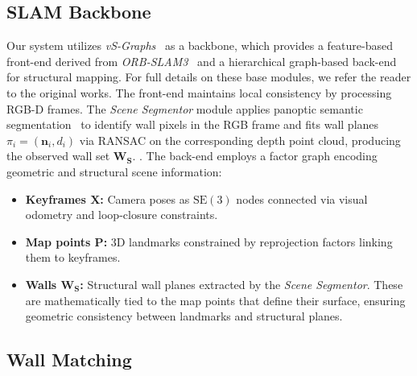 \subsection{SLAM Backbone}
\label{sec:vS-Graph}
Our system utilizes \textit{vS-Graphs}~\cite{tourani2025vsgraphs} as a backbone, which provides a feature-based front-end derived from \textit{ORB-SLAM3}~\cite{orb3} and a hierarchical graph-based back-end for structural mapping.
For full details on these base modules, we refer the reader to the original works.
The front-end maintains local consistency by processing RGB-D frames. 
{The \textit{Scene Segmentor} module applies 
panoptic semantic segmentation~\cite{yoso} to identify wall pixels in the 
RGB frame and fits wall planes $\pi_i = (\mathbf{n}_i, d_i)$ via RANSAC on 
the corresponding depth point cloud, producing the observed wall set 
$\mathbf{W_S}$.
.} 
The back-end employs a factor graph encoding geometric and structural scene information:

\begin{itemize}
    \item \textbf{Keyframes $\mathbf{X}$:} Camera poses as $\mathrm{SE}(3)$ nodes connected via visual odometry and loop-closure constraints.
    \item \textbf{Map points $\mathbf{P}$:} 3D landmarks constrained by reprojection factors linking them to keyframes.
    \item \textbf{Walls $\mathbf{W_S}$:} Structural wall planes extracted by the \textit{Scene Segmentor}. These are mathematically tied to the map points that define their surface, ensuring geometric consistency between landmarks and structural planes.
\end{itemize}

\subsection{Wall Matching}




